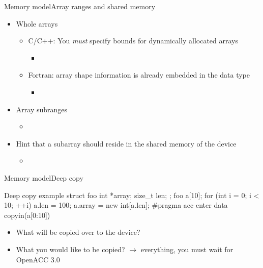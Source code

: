 \documentclass[12pt,aspectratio=169]{beamer}
\begin{document}
\begin{frame}[fragile]{Memory model}{Array ranges and shared memory}
  \begin{itemize}
  \item Whole arrays
    \begin{itemize}
    \item C/C++: You \emph{must} specify bounds for dynamically allocated arrays
      \begin{itemize}
      \item {}
      \end{itemize}
    \item Fortran: array shape information is already embedded in the data type
      \begin{itemize}
      \item {}
      \end{itemize}
    \end{itemize}
  \item Array subranges
    \begin{itemize}
    \item {}
    \end{itemize}
  \item Hint that a subarray should reside in the shared memory of the device
    \begin{itemize}
    \item {}
    \end{itemize}
  \end{itemize}
\end{frame}

\begin{frame}[fragile]{Memory model}{Deep copy}
  \begin{Cpplisting}{Deep copy example}
struct foo {
    int *array;
    size_t len;
};
foo a[10];
for (int i = 0; i < 10; ++i) {
    a.len = 100;
    a.array = new int[a.len];
}
#pragma acc enter data copyin(a[0:10])
  \end{Cpplisting}
  \begin{itemize}
  \item What will be copied over to the device? 
  \item<3-> What you would like to be copied? $\rightarrow$
    everything, you must wait for OpenACC 3.0
  \end{itemize}
\end{frame}
\end{document}
